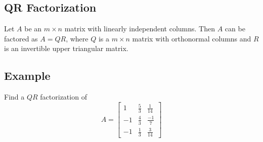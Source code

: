 \subsection*{QR Factorization}
Let $A$ be an $m\times n$ matrix with linearly independent columns. Then $A$ can be factored as $A = QR$, where $Q$ is a $m\times n$ matrix with orthonormal columns and $R$ is an invertible upper triangular matrix.
\subsection*{Example}
Find a $QR$ factorization of $$A = \begin{bmatrix}
    1&\frac{5}{3}&\frac{1}{14}\\-1&\frac{4}{3}&\frac{-1}{7}\\-1&\frac{1}{3}&\frac{3}{14}
\end{bmatrix}$$

